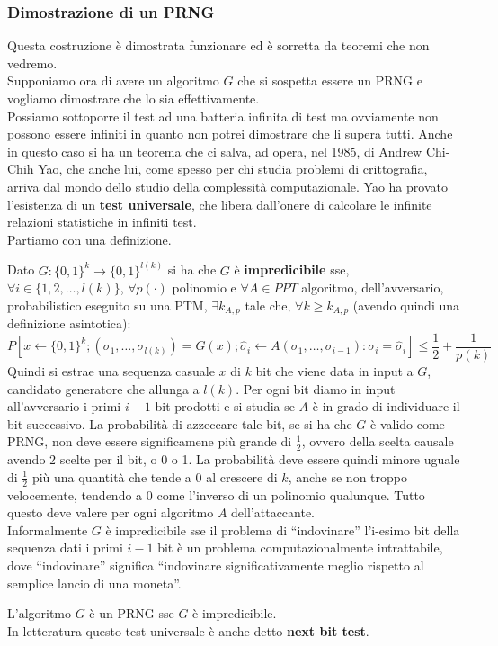 \documentclass[a4paper,12pt, oneside]{book}
\begin{document}
\subsubsection{Dimostrazione di un PRNG}
Questa costruzione è dimostrata funzionare ed è sorretta da teoremi che non
vedremo. \\
Supponiamo ora di avere un algoritmo $G$ che si sospetta essere un PRNG e
vogliamo dimostrare che lo sia effettivamente. \\
Possiamo sottoporre il test ad una batteria infinita di test ma ovviamente non
possono essere infiniti in quanto non potrei dimostrare che li supera
tutti. Anche in questo caso si ha un teorema che ci salva, ad opera, nel 1985,
di Andrew Chi-Chih Yao, che anche lui, come spesso per chi studia problemi di
crittografia, arriva dal mondo dello studio della complessità
computazionale. Yao ha provato l'esistenza di un \textbf{test universale}, che
libera dall'onere di calcolare le infinite relazioni statistiche in infiniti
test.\\
Partiamo con una definizione.
\begin{definizione}
  Dato $G:\{0,1\}^k\to\{0,1\}^{l(k)}$ si ha che $G$ è \textbf{impredicibile}
  sse, $\forall i\in\{1,2,\ldots,l(k)\}$, $\forall p(\cdot)$ polinomio e
  $\forall A\in PPT$ algoritmo, dell'avversario, probabilistico eseguito su una
  PTM, $\exists 
  k_{A,p}$ tale che, $\forall k\geq k_{A,p}$ (avendo quindi una definizione
  asintotica): 
  {\small{\[P[x\gets\{0,1\}^k;(\sigma_1,\ldots,\sigma_{l(k)})=
        G(x);\hat{\sigma}_i\gets
        A(\sigma_1,\ldots,\sigma_{i-1}):\sigma_i=\hat{\sigma}_i]\leq   
        \frac{1}{2}+\frac{1}{p(k)}\]}}
  Quindi si estrae una sequenza casuale $x$ di $k$ bit che viene data in input a
  $G$, candidato generatore che allunga a $l(k)$. Per ogni bit diamo in input
  all'avversario i primi $i-1$ bit prodotti e si studia se $A$ è in grado di
  individuare il bit successivo. La probabilità di azzeccare tale bit, se si ha
  che $G$ è valido come PRNG, non deve essere significamene più grande di
  $\frac{1}{2}$, ovvero della scelta causale avendo 2 scelte per il bit, o 0 o
  1. La probabilità deve essere quindi minore uguale di $\frac{1}{2}$ più una
  quantità che tende a 0 al crescere di $k$, anche se non troppo velocemente,
  tendendo a 0 come l'inverso di un polinomio qualunque. Tutto questo deve
  valere per ogni algoritmo $A$ dell'attaccante.\\
  Informalmente $G$ è impredicibile sse il problema di ``indovinare'' l'i-esimo
  bit della sequenza dati i primi $i-1$ bit è un problema computazionalmente
  intrattabile, dove ``indovinare'' significa ``indovinare significativamente
  meglio rispetto al semplice lancio di una moneta''.
\end{definizione}
\begin{teorema}
  L'algoritmo $G$ è un PRNG sse $G$ è impredicibile.\\
  In letteratura questo test universale è anche detto \textbf{next bit test}.
\end{teorema}
\end{document}
